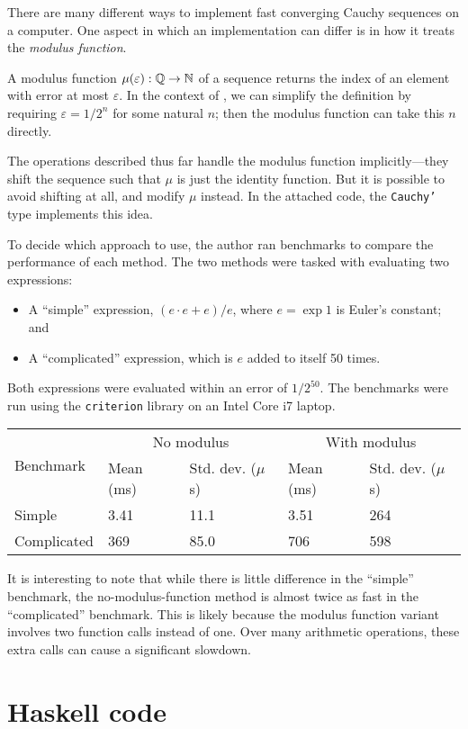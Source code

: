 \documentclass[leqno]{report}
\begin{document}
There are many different ways to implement fast converging Cauchy sequences on a computer. One aspect in which an implementation can differ is in how it treats the \textit{modulus function}.

A modulus function $\mu(\varepsilon) : \mathbb{Q} \rightarrow \mathbb{N}$ of a sequence returns the index of an element with error at most $\varepsilon$. In the context of \FCCS, we can simplify the definition by requiring $\varepsilon = 1/2^n$ for some natural $n$; then the modulus function can take this $n$ directly.

The \FCCS{} operations described thus far handle the modulus function implicitly---they shift the sequence such that $\mu$ is just the identity function. But it is possible to avoid shifting at all, and modify $\mu$ instead. In the attached code, the \texttt{Cauchy'} type implements this idea.

To decide which approach to use, the author ran benchmarks to compare the performance of each method. The two methods were tasked with evaluating two expressions:
\begin{itemize}
    \item A ``simple'' expression, $(e \cdot e + e) / e$, where $e = \exp 1$ is Euler's constant; and
    \item A ``complicated'' expression, which is $e$ added to itself 50 times.
\end{itemize}

Both expressions were evaluated within an error of $1/2^{50}$. The benchmarks were run using the \texttt{criterion} library on an Intel Core i7 laptop.

\begin{center} \begin{tabular}{lllll}
    \toprule
    \multirow{2}{*}{Benchmark} &
    \multicolumn{2}{c}{No modulus} &
    \multicolumn{2}{c}{With modulus} \\
    \cmidrule(l){2-5}
    & Mean (ms) & Std. dev. ($\mu$s) & Mean (ms) & Std. dev. ($\mu$s) \\
    \midrule
    Simple & 3.41 & 11.1 & 3.51 & 264 \\
    Complicated & 369 & 85.0 & 706 & 598 \\
    \bottomrule
\end{tabular} \end{center}

It is interesting to note that while there is little difference in the ``simple'' benchmark, the no-modulus-function method is almost twice as fast in the ``complicated'' benchmark. This is likely because the modulus function variant involves two function calls instead of one. Over many arithmetic operations, these extra calls can cause a significant slowdown.

\appendix
\chapter{Haskell code}

\inputminted[linenos,breaklines,mathescape]{haskell}{../Cauchy.hs}




\nocite{haskell2010}  %
\end{document}
